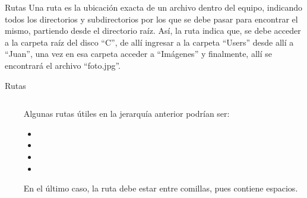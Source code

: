 
\begin{frame}{Rutas}
  Una ruta es la ubicación exacta de un archivo dentro del equipo,
  indicando todos los directorios y subdirectorios por los que se debe
  pasar para encontrar el mismo, partiendo desde el directorio raíz.
  \jump
  Así, la ruta  indica que,
  se debe acceder a la carpeta raíz del disco ``C'', de allí ingresar a la
  carpeta ``Users'' desde allí a ``Juan'', una vez en esa carpeta acceder
  a ``Imágenes'' y finalmente, allí se encontrará el archivo ``foto.jpg''.
\end{frame}


\begin{frame}{Rutas}
  \begin{columns}
    \begin{column}{0.5\textwidth}
    \end{column}
    \begin{column}{0.5\textwidth}
      Algunas rutas útiles en la jerarquía anterior podrían ser:
      \begin{itemize}
        \item {}
        \item {}
        \item {}
        \item {}
      \end{itemize}
      En el último caso, la ruta debe estar entre comillas,
      pues contiene espacios.
    \end{column}
  \end{columns}
\end{frame}

